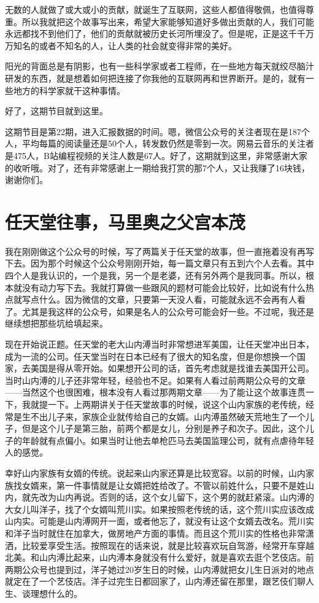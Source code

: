 \documentclass[
  letterpaper,
  DIV=11,
  numbers=noendperiod]{scrreprt}
\begin{document}
无数的人就做了或大或小的贡献，就诞生了互联网，这些人都值得敬佩，也值得尊重。所以我就把这个故事写出来，希望大家能够知道好多做出贡献的人，我们可能永远都找不到他们了，他们的贡献就被历史长河所埋没了。但是呢，正是这千千万万知名的或者不知名的人，让人类的社会就变得非常的美好。

阳光的背面总是有阴影，也有一些科学家或者工程师，在一些地方每天就绞尽脑汁研发的东西，就是想着如何把连接了你我他的互联网再和世界断开。是的，就有一些地方的科学家就干这种事情。

好了，这期节目就到这里。

这期节目是第22期，进入汇报数据的时间。嗯，微信公众号的关注者现在是187个人，平均每篇的阅读量还是50个人，转发数仍然是零到一次。网易云音乐的关注者是475人，B站编程视频的关注人数是67人。好了，这期就到这里，非常感谢大家的收听哦。对了，还有非常感谢上一期给我打赏的那7个人，又让我赚了16块钱，谢谢你们。


\chapter{任天堂往事，马里奥之父宫本茂}\label{ux4efbux5929ux5802ux5f80ux4e8bux9a6cux91ccux5965ux4e4bux7236ux5babux672cux8302}

我在刚刚做这个公众号的时候，写了两篇关于任天堂的故事，但一直拖着没有再写下去。因为那个时候这个公众号刚刚开始，每一篇文章只有五到六个人去看。其中四个人是我认识的，一个是我，另一个是老婆，还有另外两个是我同事。所以，根本就没有动力写下去。我就打算做一些跟风的题材可能会比较好，比如说有什么热点就写点什么。因为微信的文章，只要第一天没人看，可能就永远不会再有人看了。尤其是我这样的公众号，如果是名人的公众号可能会好一些。不过呢，我还是继续想把那些坑给填起来。

现在开始说正题。任天堂的老大山内溥当时非常想进军美国，让任天堂冲出日本，成为一流的公司。任天堂当时在日本已经有了很大的知名度，但是你想换一个国家，去美国是得从零开始。如果想开公司的话，首先考虑就是找谁去美国开公司。当时山内溥的儿子还非常年轻，经验也不足。如果有人看过前两期公众号的文章------当然这个也很困难，根本没有人看过那两期文章------为了能让这个故事连贯一下，我就提一下。上两期讲关于任天堂故事的时候，说这个山内家族的老传统，经常是生不出儿子来，家族企业就传给自己的女婿。山内溥虽然破天荒地生了一个儿子，但是这个儿子是第三胎，前两个都是女儿，分别是养子和次子。因此，这个儿子的年龄就有点偏小。如果当时让他去单枪匹马去美国监理公司，就有点虐待年轻人的感觉。

幸好山内家族有女婿的传统。说起来山内家还算是比较宽容。以前的时候，山内家族找女婿来，第一件事情就是让女婿把姓给改了。不管以前姓什么，只要不是姓山内，就先改为山内再说。否则的话，这个女儿留下，这个男的就赶紧滚。山内溥的大女儿叫洋子，找了个女婿叫荒川实。如果按照老传统的话，这个荒川实应该改成山内实。可能是山内溥网开一面，或者他忘了，就没有让这个女婿去改名。荒川实和洋子当时就住在加拿大，做房地产方面的事情。而且这个荒川实的性格也非常潇洒，比较爱享受生活。按照现在的话来说，就是比较喜欢玩自驾游，经常开车穿越北美。和山内溥比起来，山内溥本身就没有什么爱好，就是喜欢去逛个艺伎店。前两期公众号也提到过，洋子她过20岁生日的时候，山内溥就把女儿生日派对的地点就定在了一个艺伎店。洋子过完生日都回家了，山内溥还留在那里，跟艺伎们聊人生、谈理想什么的。
\end{document}
